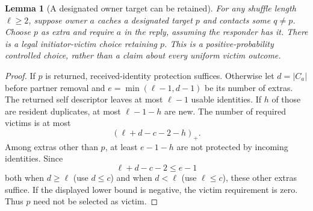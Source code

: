 \documentclass[11pt]{article}
\newtheorem{lemma}[theorem]{Lemma}
\begin{document}
\begin{lemma}[A designated owner target can be retained]
\label{lem:ownertargetretain}
For any shuffle length $\ell\ge2$, suppose owner $a$ caches a
designated target $p$ and contacts some $q\ne p$.
Choose $p$ as extra and require $a$ in the reply,
assuming the responder has it. There is a legal
initiator-victim choice retaining $p$. This is a
positive-probability controlled choice, rather than
a claim about every uniform victim outcome.
\end{lemma}
\begin{proof}
If $p$ is returned, received-identity protection suffices.
Otherwise let $d=|C_a|$ before partner removal and
$e=\min(\ell-1,d-1)$ be its number of extras.
The returned self descriptor leaves at most $\ell-1$
usable identities. If $h$ of those are resident
duplicates, at most $\ell-1-h$ are new. The number
of required victims is at most
\[
 (\ell+d-c-2-h)_+.
\]
Among extras other than $p$, at least $e-1-h$ are
not protected by incoming identities. Since
\[
 \ell+d-c-2\le e-1
\]
both when $d\ge\ell$ (use $d\le c$) and when
$d<\ell$ (use $\ell\le c$), these other extras
suffice. If the displayed lower bound is negative,
the victim requirement is zero. Thus $p$ need not
be selected as victim.
\end{proof}
\end{document}
